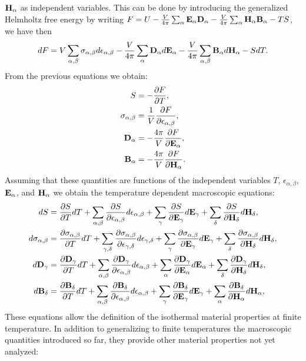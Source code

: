 \documentclass[12pt,a4paper,twoside]{report}
\begin{document}
{${\bf H}_\alpha$ as independent variables.
This can be done by introducing the generalized Helmholtz free energy 
by writing
$F=U-{V \over 4 \pi}\sum_{\alpha} {\bf E}_\alpha {\bf D}_\alpha -
{V\over 4 \pi} \sum_{\alpha} {\bf H}_\alpha {\bf B}_\alpha - TS $, 
we have then
\begin{equation}
dF = V \sum_{\alpha,\beta} \sigma_{\alpha,\beta} d \epsilon_{\alpha,\beta}
- {V\over 4 \pi} \sum_\alpha {\bf D}_\alpha d {\bf E}_\alpha - 
{V \over 4 \pi} \sum_{\alpha,\beta} {\bf B}_{\alpha} d {\bf H}_\alpha - S dT.
\end{equation}
From the previous equations we obtain:
\begin{align}
S&= -{\partial F \over \partial T}, \\
\sigma_{\alpha,\beta}&= {1\over V}
{\partial F \over \partial \epsilon_{\alpha,\beta}}, \\
{\bf D}_{\alpha}&= -{4 \pi \over V}
{\partial F \over \partial {\bf E}_{\alpha}}, \\
{\bf B}_{\alpha}&= -{4 \pi \over V}
{\partial F \over \partial {\bf H}_{\alpha}}.
\end{align}
Assuming that these quantities are functions of the independent variables
$T$, $\epsilon_{\alpha,\beta}$, ${\bf E}_\alpha$, and ${\bf H}_\alpha$ we
obtain the temperature dependent macroscopic equations:
\begin{align}
dS&= {\partial S \over \partial T} dT+\sum_{\alpha,\beta}
{\partial S \over \partial \epsilon_{\alpha,\beta}}d\epsilon_{\alpha,\beta}
+\sum_\gamma{\partial S \over \partial {\bf E}_{\gamma}}d{\bf E}_{\gamma}+ 
\sum_\delta{\partial S \over \partial {\bf H}_{\delta}}d{\bf H}_{\delta}, \\
d\sigma_{\alpha,\beta}&=
{\partial \sigma_{\alpha,\beta} \over \partial T} dT+\sum_{\gamma,\delta}
{\partial \sigma_{\alpha,\beta} \over \partial 
\epsilon_{\gamma,\delta}}d\epsilon_{\gamma,\delta}
+\sum_\gamma{\partial \sigma_{\alpha,\beta} \over \partial 
{\bf E}_{\gamma}}d{\bf E}_{\gamma}+ 
\sum_\delta{\partial \sigma_{\alpha,\beta} \over \partial 
{\bf H}_{\delta}}d{\bf H}_{\delta}, \\
d{\bf D}_\gamma&=
{\partial  {\bf D}_\gamma \over \partial T} dT+\sum_{\alpha,\beta}
{\partial {\bf D}_\gamma \over \partial \epsilon_{\alpha,\beta}}
d\epsilon_{\alpha,\beta}
+\sum_\alpha{\partial {\bf D}_\gamma \over \partial {\bf E}_{\alpha}}d{\bf E}_{\alpha}+ 
\sum_\delta{\partial {\bf D}_\gamma \over \partial {\bf H}_{\delta}}d{\bf H}_{\delta}, \\
d{\bf B}_\delta&=
{\partial {\bf B}_\delta \over \partial T} dT+\sum_{\alpha,\beta}
{\partial {\bf B}_\delta \over \partial \epsilon_{\alpha,\beta}}
d\epsilon_{\alpha,\beta}
+\sum_\gamma{\partial {\bf B}_\delta \over \partial {\bf E}_{\gamma}}
d{\bf E}_{\gamma}+ 
\sum_\alpha{\partial {\bf B}_\delta \over \partial {\bf H}_{\alpha}}
d{\bf H}_{\alpha}, 
\end{align}
These equations allow the definition of the isothermal material properties 
at finite temperature. In addition to generalizing to finite temperatures
the macroscopic quantities introduced so far, they provide other material 
properties not yet analyzed:

}
\end{document}
